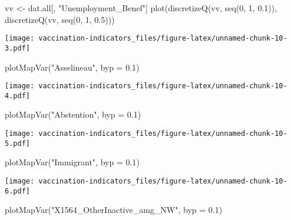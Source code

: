\documentclass[
]{article}
\newenvironment{Shaded}{\begin{snugshade}}{\end{snugshade}}
\newcommand{\AttributeTok}[1]{\textcolor[rgb]{0.77,0.63,0.00}{#1}}
\newcommand{\DecValTok}[1]{\textcolor[rgb]{0.00,0.00,0.81}{#1}}
\newcommand{\FloatTok}[1]{\textcolor[rgb]{0.00,0.00,0.81}{#1}}
\newcommand{\FunctionTok}[1]{\textcolor[rgb]{0.00,0.00,0.00}{#1}}
\newcommand{\NormalTok}[1]{#1}
\newcommand{\OtherTok}[1]{\textcolor[rgb]{0.56,0.35,0.01}{#1}}
\newcommand{\StringTok}[1]{\textcolor[rgb]{0.31,0.60,0.02}{#1}}
\begin{document}
\begin{Shaded}
\begin{Highlighting}[]
\NormalTok{vv }\OtherTok{\textless{}{-}}\NormalTok{ dat.all[, }\StringTok{"Unemployment\_Benef"}\NormalTok{]}
\FunctionTok{plot}\NormalTok{(}\FunctionTok{discretizeQ}\NormalTok{(vv, }\FunctionTok{seq}\NormalTok{(}\DecValTok{0}\NormalTok{, }\DecValTok{1}\NormalTok{, }\FloatTok{0.1}\NormalTok{)), }
     \FunctionTok{discretizeQ}\NormalTok{(vv, }\FunctionTok{seq}\NormalTok{(}\DecValTok{0}\NormalTok{, }\DecValTok{1}\NormalTok{, }\FloatTok{0.5}\NormalTok{)))}
\end{Highlighting}
\end{Shaded}

\texttt{[image: vaccination-indicators\_files/figure-latex/unnamed-chunk-10-3.pdf]}

\begin{Shaded}
\begin{Highlighting}[]
\FunctionTok{plotMapVar}\NormalTok{(}\StringTok{"Asselineau"}\NormalTok{, }\AttributeTok{byp =} \FloatTok{0.1}\NormalTok{)}
\end{Highlighting}
\end{Shaded}

\texttt{[image: vaccination-indicators\_files/figure-latex/unnamed-chunk-10-4.pdf]}

\begin{Shaded}
\begin{Highlighting}[]
\FunctionTok{plotMapVar}\NormalTok{(}\StringTok{"Abstention"}\NormalTok{, }\AttributeTok{byp =} \FloatTok{0.1}\NormalTok{)}
\end{Highlighting}
\end{Shaded}

\texttt{[image: vaccination-indicators\_files/figure-latex/unnamed-chunk-10-5.pdf]}

\begin{Shaded}
\begin{Highlighting}[]
\FunctionTok{plotMapVar}\NormalTok{(}\StringTok{"Immigrant"}\NormalTok{, }\AttributeTok{byp =} \FloatTok{0.1}\NormalTok{)}
\end{Highlighting}
\end{Shaded}

\texttt{[image: vaccination-indicators\_files/figure-latex/unnamed-chunk-10-6.pdf]}

\begin{Shaded}
\begin{Highlighting}[]
\FunctionTok{plotMapVar}\NormalTok{(}\StringTok{"X1564\_OtherInactive\_amg\_NW"}\NormalTok{, }\AttributeTok{byp =} \FloatTok{0.1}\NormalTok{)}
\end{Highlighting}
\end{Shaded}
\end{document}
